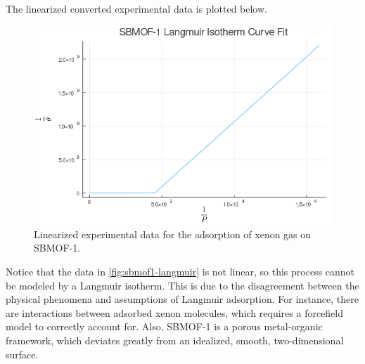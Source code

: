 \documentclass{article}
\begin{document}
The linearized converted experimental data is plotted below.
\begin{figure}[H]
    \centering
    \includegraphics[width=\textwidth]{fig/sbmof1-langmuir.png}
    \caption{Linearized experimental data for the adsorption of xenon gas on SBMOF-1.}
    \label{fig:sbmof1-langmuir}
\end{figure}
Notice that the data in \autoref{fig:sbmof1-langmuir} is not linear, so this process cannot be modeled by a Langmuir isotherm.
This is due to the disagreement between the physical phenomena and assumptions of Langmuir adsorption.
For instance, there are interactions between adsorbed xenon molecules, which requires a forcefield model to correctly account for.
Also, SBMOF-1 is a porous metal-organic framework, which deviates greatly from an idealized, smooth, two-dimensional surface.
\end{document}
